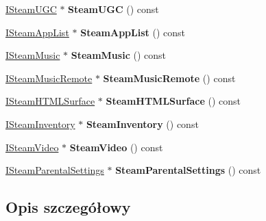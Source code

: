 \begin{DoxyCompactItemize}
\mbox{\label{class_c_steam_a_p_i_context_ad25f2db3c174f18b878edee343b0a54e}} 
\hyperlink{class_i_steam_u_g_c}{I\+Steam\+U\+GC} $\ast$ {\bfseries Steam\+U\+GC} () const
\item 
\mbox{\label{class_c_steam_a_p_i_context_a20a3b468a071bf3d1e250cde9d875b12}} 
\hyperlink{class_i_steam_app_list}{I\+Steam\+App\+List} $\ast$ {\bfseries Steam\+App\+List} () const
\item 
\mbox{\label{class_c_steam_a_p_i_context_aa5f17cef3a724668e884be2ad7f2d48d}} 
\hyperlink{class_i_steam_music}{I\+Steam\+Music} $\ast$ {\bfseries Steam\+Music} () const
\item 
\mbox{\label{class_c_steam_a_p_i_context_a4e42a63934dc5f31e900f771e3752d48}} 
\hyperlink{class_i_steam_music_remote}{I\+Steam\+Music\+Remote} $\ast$ {\bfseries Steam\+Music\+Remote} () const
\item 
\mbox{\label{class_c_steam_a_p_i_context_a51c53b1f68cd5f40789a3cfca6a85120}} 
\hyperlink{class_i_steam_h_t_m_l_surface}{I\+Steam\+H\+T\+M\+L\+Surface} $\ast$ {\bfseries Steam\+H\+T\+M\+L\+Surface} () const
\item 
\mbox{\label{class_c_steam_a_p_i_context_aa84a50458ed30d250bdc54bdae50bc9a}} 
\hyperlink{class_i_steam_inventory}{I\+Steam\+Inventory} $\ast$ {\bfseries Steam\+Inventory} () const
\item 
\mbox{\label{class_c_steam_a_p_i_context_a785fc1a946443ddf0dacd007ca805689}} 
\hyperlink{class_i_steam_video}{I\+Steam\+Video} $\ast$ {\bfseries Steam\+Video} () const
\item 
\mbox{\label{class_c_steam_a_p_i_context_a73865dfe8a0f13dbfe4e766adb4f52e3}} 
\hyperlink{class_i_steam_parental_settings}{I\+Steam\+Parental\+Settings} $\ast$ {\bfseries Steam\+Parental\+Settings} () const
\end{DoxyCompactItemize}


\subsection{Opis szczegółowy}


